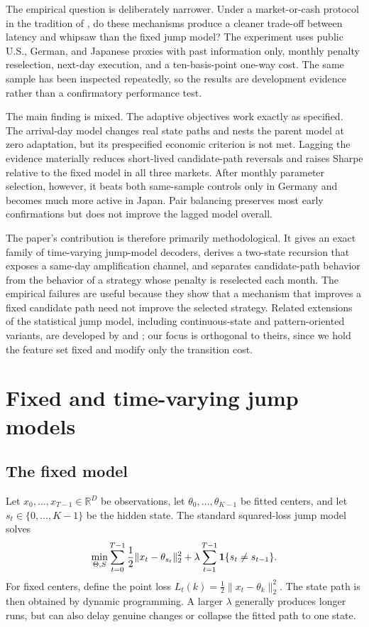 The empirical question is deliberately narrower. Under a market-or-cash protocol
in the tradition of \citet{shu2024}, do these mechanisms produce a cleaner
trade-off between latency and whipsaw than the fixed jump model? The experiment
uses public U.S., German, and Japanese proxies with past information only,
monthly penalty reselection, next-day execution, and a ten-basis-point one-way
cost. The same sample has been inspected repeatedly, so the results are
development evidence rather than a confirmatory performance test.

The main finding is mixed. The adaptive objectives work exactly as specified.
The arrival-day model changes real state paths and nests the parent model at zero
adaptation, but its prespecified economic criterion is not met. Lagging the
evidence materially reduces short-lived candidate-path reversals and raises Sharpe
relative to the fixed model in all three markets. After monthly parameter
selection, however, it beats both same-sample controls only in Germany and
becomes much more active in Japan. Pair balancing preserves most early
confirmations but does not improve the lagged model overall.

The paper's contribution is therefore primarily methodological. It gives an exact
family of time-varying jump-model decoders, derives a two-state recursion that
exposes a same-day amplification channel, and separates candidate-path behavior
from the behavior of a strategy whose penalty is reselected each month. The
empirical failures are useful because they show that a mechanism that improves a
fixed candidate path need not improve the selected strategy. Related extensions
of the statistical jump model, including continuous-state and pattern-oriented
variants, are developed by \citet{aydinhan2024} and \citet{nystrup2021}; our
focus is orthogonal to theirs, since we hold the feature set fixed and modify
only the transition cost.

\section{Fixed and time-varying jump models}

\subsection{The fixed model}

Let $x_0,\ldots,x_{T-1}\in\mathbb{R}^D$ be observations, let
$\theta_0,\ldots,\theta_{K-1}$ be fitted centers, and let
$s_t\in\{0,\ldots,K-1\}$ be the hidden state. The standard squared-loss jump
model solves
\begin{equation}
\min_{\Theta,S}\sum_{t=0}^{T-1}\frac{1}{2}\lVert x_t-\theta_{s_t}\rVert_2^2
+\lambda\sum_{t=1}^{T-1}\mathbf{1}\{s_t\neq s_{t-1}\}.
\label{eq:fixed}
\end{equation}
For fixed centers, define the point loss
$L_t(k)=\tfrac{1}{2}\lVert x_t-\theta_k\rVert_2^2$. The state path is then
obtained by dynamic programming. A larger $\lambda$ generally produces longer
runs, but can also delay genuine changes or collapse the fitted path to one
state.

